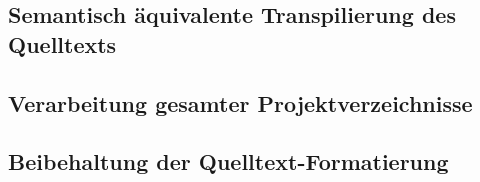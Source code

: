   \subsection{Semantisch äquivalente Transpilierung des Quelltexts}
  \label{subsection:requirement:semantic-equivalence}

  \subsection{Verarbeitung gesamter Projektverzeichnisse}
  \label{subsection:requirement:batch-processing}

  \subsection{Beibehaltung der Quelltext-Formatierung}
  \label{subsection:requirement:format}
